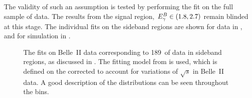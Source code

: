 The validity of such an assumption is tested by performing the \Mbc fit on the full sample of data. 
The results from the signal region, ${E^B_{\gamma}}\in(1.8,2.7)$ remain blinded at this stage.
The individual \Mbc fits on the \EB sideband regions are shown for data in , and for simulation in .
\begin{figure}[htbp!]
    \centering
    \caption{\label{fig:sideband_data_fit}    
    The \Mbc fits on Belle~II data corresponding to 189~\invfb of data in \EB sideband regions,
    as discussed in .
    The fitting model from  is used,
    which is defined on the corrected \Mbc to account for variations of $\sqrt{s}$ in Belle~II data.
    A good description of the \Mbc distributions can be seen throughout the \EB bins.
    }
\end{figure}
